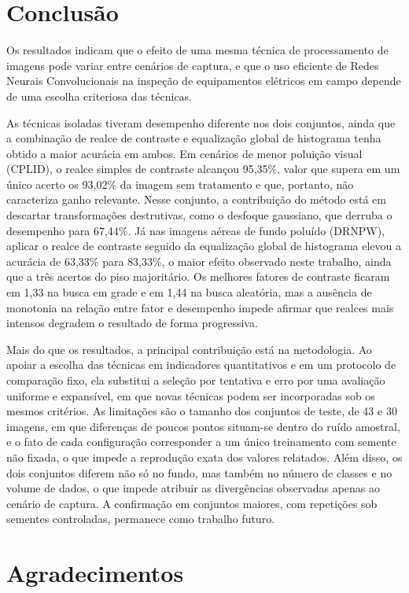 \documentclass[conference]{IEEEtran}
\begin{document}
\section{Conclusão}

Os resultados indicam que o efeito de uma mesma técnica de processamento de imagens pode variar entre cenários de captura, e que o uso eficiente de Redes Neurais Convolucionais na inspeção de equipamentos elétricos em campo depende de uma escolha criteriosa das técnicas.

As técnicas isoladas tiveram desempenho diferente nos dois conjuntos, ainda que a combinação de realce de contraste e equalização global de histograma tenha obtido a maior acurácia em ambos. Em cenários de menor poluição visual (CPLID), o realce simples de contraste alcançou 95,35\%, valor que supera em um único acerto os 93,02\% da imagem sem tratamento e que, portanto, não caracteriza ganho relevante. Nesse conjunto, a contribuição do método está em descartar transformações destrutivas, como o desfoque gaussiano, que derruba o desempenho para 67,44\%. Já nas imagens aéreas de fundo poluído (DRNPW), aplicar o realce de contraste seguido da equalização global de histograma elevou a acurácia de 63,33\% para 83,33\%, o maior efeito observado neste trabalho, ainda que a três acertos do piso majoritário. Os melhores fatores de contraste ficaram em 1,33 na busca em grade e em 1,44 na busca aleatória, mas a ausência de monotonia na relação entre fator e desempenho impede afirmar que realces mais intensos degradem o resultado de forma progressiva.

Mais do que os resultados, a principal contribuição está na metodologia. Ao apoiar a escolha das técnicas em indicadores quantitativos e em um protocolo de comparação fixo, ela substitui a seleção por tentativa e erro por uma avaliação uniforme e expansível, em que novas técnicas podem ser incorporadas sob os mesmos critérios. As limitações são o tamanho dos conjuntos de teste, de 43 e 30 imagens, em que diferenças de poucos pontos situam-se dentro do ruído amostral, e o fato de cada configuração corresponder a um único treinamento com semente não fixada, o que impede a reprodução exata dos valores relatados. Além disso, os dois conjuntos diferem não só no fundo, mas também no número de classes e no volume de dados, o que impede atribuir as divergências observadas apenas ao cenário de captura. A confirmação em conjuntos maiores, com repetições sob sementes controladas, permanece como trabalho futuro.

\section*{Agradecimentos}
\end{document}
